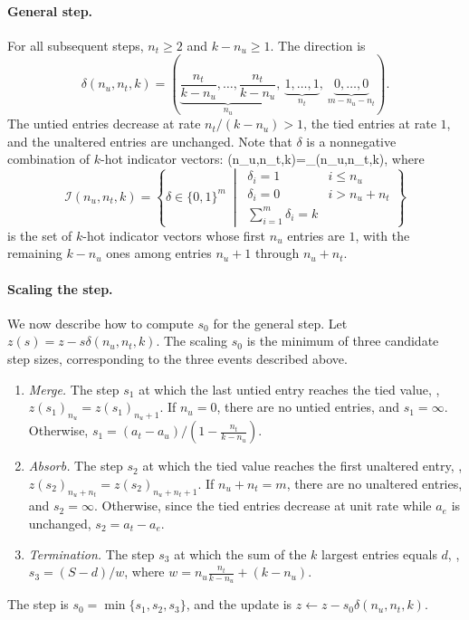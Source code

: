 \documentclass[12pt]{article}
\begin{document}
\paragraph{General step.}
For all subsequent steps, $n_t \geq 2$ and $k - n_u \geq 1$.
The direction is
\[
\delta(n_u,n_t,k) = \left(\underbrace{\frac{n_t}{k-n_u}, \ldots,
\frac{n_t}{k-n_u}}_{n_u}, ~\underbrace{1, \ldots, 1}_{n_t},~
\underbrace{0,\ldots,0}_{m-n_u-n_t}\right).
\]
The untied entries decrease at rate $n_t/(k-n_u) > 1$, the tied entries
at rate $1$, and the unaltered entries are unchanged.
Note that $\delta$ is a nonnegative combination of $k$-hot indicator vectors:
\BEQ\label{e-delta}
\delta(n_u,n_t,k)=\sum_{\delta\in{}(n_u,n_t,k)}\delta,
\EEQ
where
\[
\mathcal{I}(n_u,n_t,k) = \left\{\delta\in\{0,1\}^m ~\middle|~ \begin{array}{ll}
    \delta_i=1 & i \leq n_u\\
    \delta_i=0 & i > n_u+n_t\\
    \sum_{i=1}^m \delta_i = k
\end{array}
\right\}
\]
is the set of $k$-hot indicator vectors whose first $n_u$ entries are $1$,
with the remaining $k-n_u$ ones among entries $n_u+1$ through $n_u+n_t$.

\paragraph{Scaling the step.}
We now describe how to compute $s_0$ for the general step.
Let $z(s) = z - s\delta(n_u,n_t,k)$.
The scaling $s_0$ is the minimum of three candidate step sizes,
corresponding to the three events described above.

\begin{enumerate}[label=(\arabic*)]
\item \emph{Merge.}
The step $s_1$ at which the last untied entry reaches the tied value,
\ie, $z(s_1)_{n_u} = z(s_1)_{n_u+1}$.
If $n_u = 0$, there are no untied entries, and $s_1 = \infty$. Otherwise,
$s_1 = \left(a_t - a_u\right)/\left(1-\frac{n_t}{k-n_u}\right)$.

\item \emph{Absorb.}
The step $s_2$ at which the tied value reaches the first unaltered entry,
\ie, $z(s_2)_{n_u+n_t} = z(s_2)_{n_u+n_t+1}$.
If $n_u+n_t = m$, there are no unaltered entries, and $s_2 = \infty$.
Otherwise, since the tied entries decrease at unit rate while $a_e$ is
unchanged, $s_2 = a_t - a_e$.

\item \emph{Termination.}
The step $s_3$ at which the sum of the $k$ largest entries equals $d$,
\ie, $s_3 = (S - d)/w$, where
$w = n_u\frac{n_t}{k-n_u}+(k-n_u)$.
\end{enumerate}
The step is $s_0 = \min\{s_1,s_2,s_3\}$, and the update is
$z \leftarrow z - s_0\delta(n_u,n_t,k)$.
\end{document}
